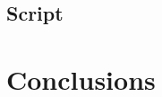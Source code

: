 \documentclass[smallextended,referee]{svjour3}
\begin{document}
\subsection{\textbf{Script}}




\section{Conclusions}

\begin{acknowledgements}

\end{acknowledgements}

\appendix




\end{document}
